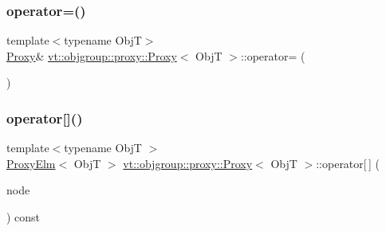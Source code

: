 \subsubsection{\texorpdfstring{operator=()}{operator=()}}
{\footnotesize\ttfamily template$<$typename ObjT$>$ \\
\hyperlink{structvt_1_1objgroup_1_1proxy_1_1_proxy}{Proxy}\& \hyperlink{structvt_1_1objgroup_1_1proxy_1_1_proxy}{vt\+::objgroup\+::proxy\+::\+Proxy}$<$ ObjT $>$\+::operator= (\begin{DoxyParamCaption}\item[{\hyperlink{structvt_1_1objgroup_1_1proxy_1_1_proxy}{Proxy}$<$ ObjT $>$ const \&}]{ }\end{DoxyParamCaption})\hspace{0.3cm}{\ttfamily [default]}}

\mbox{\label{structvt_1_1objgroup_1_1proxy_1_1_proxy_a00a267a8730fe2547776ff0136ea3895}} 
\subsubsection{\texorpdfstring{operator[]()}{operator[]()}}
{\footnotesize\ttfamily template$<$typename ObjT $>$ \\
\hyperlink{structvt_1_1objgroup_1_1proxy_1_1_proxy_elm}{Proxy\+Elm}$<$ ObjT $>$ \hyperlink{structvt_1_1objgroup_1_1proxy_1_1_proxy}{vt\+::objgroup\+::proxy\+::\+Proxy}$<$ ObjT $>$\+::operator\mbox{[}$\,$\mbox{]} (\begin{DoxyParamCaption}\item[{\hyperlink{namespacevt_a866da9d0efc19c0a1ce79e9e492f47e2}{Node\+Type}}]{node }\end{DoxyParamCaption}) const}

\mbox{\label{structvt_1_1objgroup_1_1proxy_1_1_proxy_a35c28f545796b6383d795b833b0cf9c3}} 
